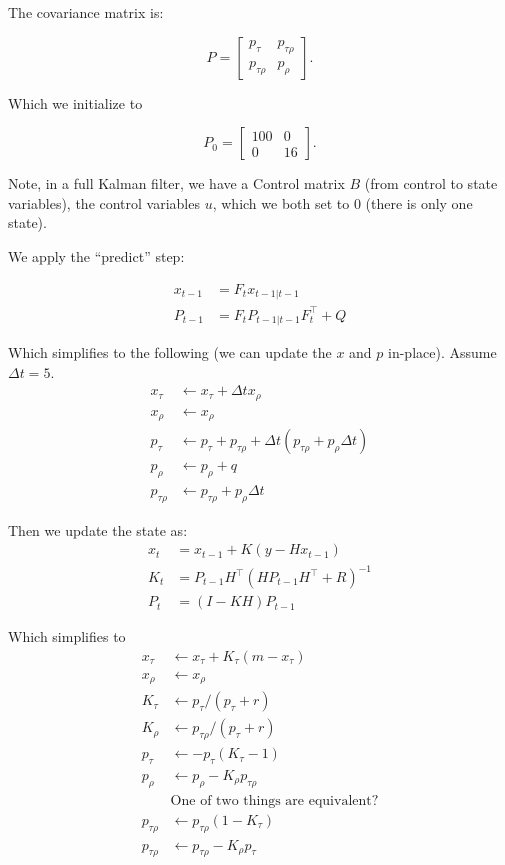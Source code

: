 \documentclass[11pt]{article}
\begin{document}
The covariance matrix is:

\[
	P = \begin{bmatrix} p_\tau & p_{\tau \rho} \\ p_{\tau \rho} & p_\rho \end{bmatrix}.
\]

Which we initialize to

\[
	P_0 = \begin{bmatrix} 100 & 0 \\ 0 & 16 \end{bmatrix}.
\]

Note, in a full Kalman filter, we have a Control matrix $B$ (from control to state variables), the control variables $u$, which we both set to 0 (there is only one state).

We apply the ``predict'' step:

\begin{align*}
	x_{t-1} &= F_t x_{t-1 | t-1} \\
	P_{t-1} &= F_t P_{t-1 | t-1} F^{\top}_{t} + Q
\end{align*}

Which simplifies to the following (we can update the $x$ and $p$ in-place). Assume $\Delta t = 5$.
\begin{align*}
	x_\tau &\gets x_\tau + \Delta t x_\rho \\
	x_\rho &\gets x_\rho \\
	p_\tau &\gets p_\tau + p_{\tau\rho} + \Delta t (p_{\tau\rho} + p_\rho \Delta t) \\
	p_\rho &\gets p_\rho + q\\
	p_{\tau\rho} &\gets p_{\tau\rho} + p_\rho \Delta t
\end{align*}

Then we update the state as:
\begin{align*}
	x_t &= x_{t-1} + K (y - H x_{t-1}) \\
	K_t &= P_{t-1} H^\top (H P_{t-1} H^\top + R)^{-1} \\
	P_t &= (I - K H) P_{t-1}
\end{align*}

Which simplifies to
\begin{align*}
	x_\tau &\gets x_\tau + K_\tau (m - x_\tau) \\
	x_\rho &\gets x_\rho \\
	K_\tau &\gets p_\tau / (p_{\tau} + r) \\
	K_\rho &\gets p_{\tau\rho} / (p_{\tau} + r) \\
	p_\tau &\gets -p_\tau (K_\tau - 1) \\
	p_\rho &\gets p_\rho - K_\rho p_{\tau\rho} \\
	&\text{One of two things are equivalent?} \\
	p_{\tau\rho} &\gets p_{\tau\rho}(1 - K_\tau) \\
	p_{\tau\rho} &\gets p_{\tau\rho} - K_\rho p_\tau
\end{align*}
\end{document}
